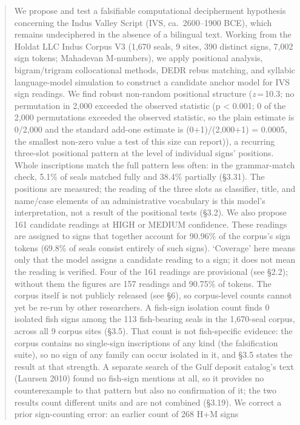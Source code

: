 \documentclass[11pt]{article}
\begin{document}
\begin{abstract}
We propose and test a falsifiable computational decipherment hypothesis
concerning the Indus Valley Script (IVS, ca.~2600--1900 BCE), which
remains undeciphered in the absence of a bilingual text. Working from the
Holdat LLC Indus Corpus V3 (1,670 seals, 9 sites, 390 distinct signs,
7,002 sign tokens; Mahadevan M-numbers), we apply positional analysis,
bigram/trigram collocational methods, DEDR rebus matching, and syllabic
language-model simulation to construct a candidate anchor model for IVS
sign readings. We find robust non-random positional structure
(\textit{z}\,=\,10.3; no permutation in 2,000 exceeded the observed statistic (p \textless{} 0.001; 0 of the 2,000 permutations exceeded the observed statistic, so the plain estimate is 0/2,000 and the standard add-one estimate is (0+1)/(2,000+1) = 0.0005, the smallest non-zero value a test of this size can report)),
a recurring three-slot positional pattern at the level of individual signs' positions. Whole inscriptions match the full pattern less often: in the grammar-match check, 5.1\% of seals matched fully and 38.4\% partially (§3.31). The positions are measured; the reading of the three slots as classifier, title, and name/case elements of an administrative vocabulary is this model's interpretation, not a result of the positional tests (§3.2). We also propose 161 candidate readings at HIGH or MEDIUM confidence. These readings are assigned to signs that together account for 90.96\% of the corpus's sign tokens (69.8\% of seals consist entirely of such signs). `Coverage' here means only that the model assigns a candidate reading to a sign; it does not mean the reading is verified. Four of the 161 readings are provisional (see §2.2); without them the figures are 157 readings and 90.75\% of tokens. The corpus itself is not publicly released (see §6), so corpus-level counts cannot yet be re-run by other researchers. A fish-sign isolation count finds 0 isolated fish signs among the 113 fish-bearing seals in the 1,670-seal corpus, across all 9 corpus sites (§3.5). That count is not fish-specific evidence: the corpus contains no single-sign inscriptions of any kind (the falsification suite), so no sign of any family can occur isolated in it, and §3.5 states the result at that strength. A separate search of the Gulf deposit catalog's text (Laursen 2010) found no fish-sign mentions at all, so it provides no counterexample to that pattern but also no confirmation of it; the two results count different units and are not combined (§3.19).
We correct a prior sign-counting error: an earlier count of 268 H+M signs

\end{abstract}
\end{document}
